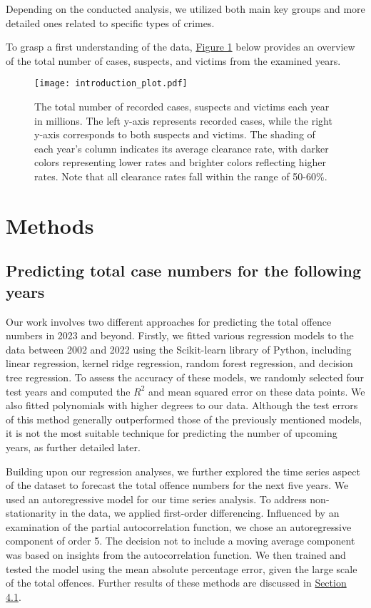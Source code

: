 \documentclass{article}
\theoremstyle{plain}
\theoremstyle{definition}
\theoremstyle{remark}
\begin{document}
Depending on the conducted analysis, we utilized both main key groups and more detailed ones related to specific types of crimes.

To grasp a first understanding of the data, \hyperref[fig:intro]{Figure 1} below provides an overview of the total number of cases, suspects, and victims from the examined years.

\begin{figure}[h]
    \texttt{[image: introduction\_plot.pdf]}\label{fig:intro}
    \caption{The total number of recorded cases, suspects and victims each year in millions. The left y-axis represents recorded cases, while the right y-axis corresponds to both suspects and victims. The shading of each year's column indicates its average clearance rate, with darker colors representing lower rates and brighter colors reflecting higher rates. Note that all clearance rates fall within the range of 50-60\%.}
    
\end{figure}

\section{Methods}\label{sec:methods}

\subsection{Predicting total case numbers for the following years}\label{subsec:methods_prediction}
Our work involves two different approaches for predicting the total offence numbers in 2023 and beyond. Firstly, we fitted various regression models to the data between 2002 and 2022 using the Scikit-learn library of Python, including linear regression, kernel ridge regression, random forest regression, and decision tree regression. To assess the accuracy of these models, we randomly selected four test years and computed the $R^2$ and mean squared error on these data points. We also fitted polynomials with higher degrees to our data. Although the test errors of this method generally outperformed those of the previously mentioned models, it is not the most suitable technique for predicting the number of upcoming years, as further detailed later.

Building upon our regression analyses, we further explored the time series aspect of the dataset to forecast the total offence numbers for the next five years. We used an autoregressive model for our time series analysis. To address non-stationarity in the data, we applied first-order differencing. Influenced by an examination of the partial autocorrelation function, we chose an autoregressive component of order 5. The decision not to include a moving average component was based on insights from the autocorrelation function. We then trained and tested the model using the mean absolute percentage error, given the large scale of the total offences. Further results of these methods are discussed in \hyperref[subsec:results_pred]{Section 4.1}.
\end{document}
